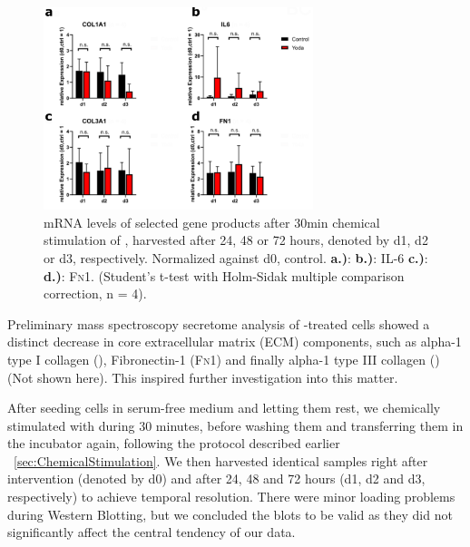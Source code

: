 \begin{figure}[ht]
	\centering
	\includegraphics[width = 0.7\textwidth]{NormalYodaExp_PCR.png}
	\caption{mRNA levels of selected gene products after 30min chemical stimulation of \Piezo{}, harvested after 24, 48 or 72 hours, denoted by d1, d2 or d3, respectively. Normalized against d0, control.\hfill \newline
		\textbf{a.)}: \colone{}
		\textbf{b.)}: IL-6
		\textbf{c.)}: \colthree{}
		\textbf{d.)}: \textsc{Fn}1. 
		(Student's t-test with Holm-Sidak multiple comparison correction, n = 4). 
	}
	\label{fig:Yoda_Norm_PCR}
\end{figure}


Preliminary mass spectroscopy secretome analysis of \Yoda-treated cells showed a distinct decrease in core extracellular matrix (ECM) components, such as alpha-1 type I collagen (\colone), Fibronectin-1 (\textsc{Fn1}) and finally alpha-1 type III collagen (\colthree) (Not shown here). This inspired further investigation into this matter.\par



After seeding cells in serum-free medium and letting them rest, we chemically stimulated \Piezo{} with \Yoda{} during 30 minutes, before washing them and transferring them in the incubator again, following the protocol described earlier ~\vref{sec:ChemicalStimulation}. We then harvested identical samples right after intervention (denoted by d0) and after 24, 48 and 72 hours (d1, d2 and d3, respectively) to achieve temporal resolution. There were minor loading problems during Western Blotting, but we concluded the blots to be valid as they did not significantly affect the central tendency of our data. \par

